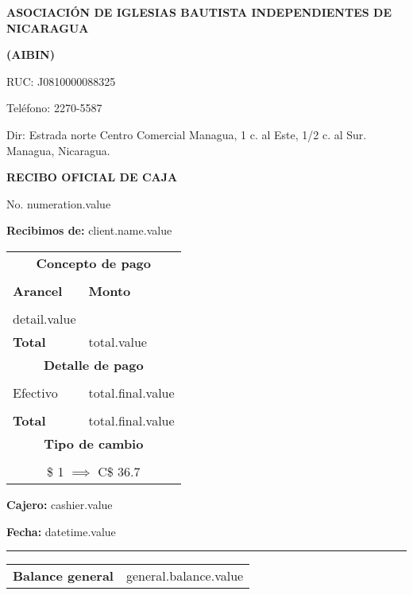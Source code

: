 \documentclass[11pt]{article}
\newcommand{\thenumber}{numeration.value}
\newcommand{\clientName}{client.name.value}
\newcommand{\detail}{detail.value}
\newcommand{\total}{total.value}
\newcommand{\finalTotal}{total.final.value}
\newcommand{\cashier}{cashier.value}
\newcommand{\datetime}{datetime.value}
\newcommand{\generalBalance}{general.balance.value}
\begin{document}
    \begin{center}
        \textbf{ASOCIACIÓN DE IGLESIAS BAUTISTA INDEPENDIENTES DE NICARAGUA}\par
        \textbf{(AIBIN)}\par
        {
            \small
            RUC: J0810000088325\par
            Teléfono: 2270-5587\par
            Dir: Estrada norte Centro Comercial Managua, 1 c. al Este, 1/2 c. al Sur. Managua, Nicaragua.\par
        }
        \textbf{RECIBO OFICIAL DE CAJA}\par
        No. \thenumber
    \end{center}
    \textbf{Recibimos de:} \clientName\par

    \begin{longtable}{p{3.8cm} p{1.8cm}}
        \hline
        \multicolumn{2}{c}{\textbf{Concepto de pago}} \\\\
        \textbf{Arancel} & \textbf{Monto} \\\\
        \detail\\
        \textbf{Total} & \total\\
        \hline
        \multicolumn{2}{c}{\textbf{Detalle de pago}} \\\\
        Efectivo & \finalTotal\\
        \\\textbf{Total} & \finalTotal\\
        \hline
        \multicolumn{2}{c}{\textbf{Tipo de cambio}} \\\\
        \multicolumn{2}{c}{\$ 1 $\implies$ C\$ 36.7}\\
    \end{longtable}
    
    \textbf{Cajero:} \cashier\par
    \textbf{Fecha:} \datetime

    \begin{table}[H]
        \centering
        \hrule
        \begin{tabular}{p{3.8cm} p{1.8cm}}
            \textbf{Balance general} & \generalBalance
        \end{tabular}
    \end{table}
\end{document}
